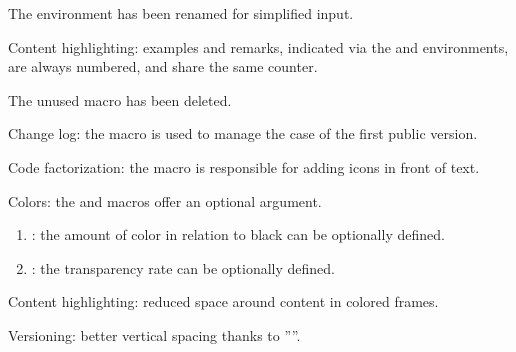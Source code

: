 \documentclass[12pt, a4paper]{article}
\begin{document}
\begin{tdocbreak}
	\item The  environment has been renamed  for simplified input.

	\item Content highlighting: examples and remarks, indicated via the  and  environments, are always numbered, and share the same counter.

	\item The unused macro  has been deleted.
\end{tdocbreak}


\begin{tdocnew}
    \item Change log: the  macro is used to manage the case of the first public version.

    \item Code factorization: the  macro is responsible for adding icons in front of text.
\end{tdocnew}


\begin{tdocupdate}
	\item Colors: the  and  macros offer an optional argument.
	\begin{enumerate}
		\item {} : the amount of color in relation to black can be optionally defined.

		\item {} : the transparency rate can be optionally defined.
	\end{enumerate}

    \item Content highlighting: reduced space around content in colored frames.

	\item Versioning: better vertical spacing thanks to ''\vphantom{Mp}''.
\end{tdocupdate}
\end{document}

